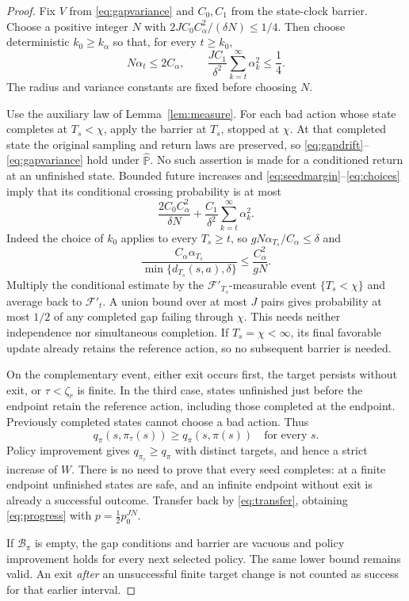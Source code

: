 \begin{proof}
Fix $V$ from \eqref{eq:gapvariance} and $C_0,C_1$ from the state-clock barrier. Choose a positive integer
$N$ with $2JC_0 C_\alpha^2/(\delta N)\le1/4$. Then choose deterministic $k_0\ge k_\alpha$ so that, for every $t\ge k_0$,
\begin{equation}\label{eq:choices}
N\alpha_t\le2C_\alpha,\qquad\frac{JC_1}{\delta^2}\sum_{k=t}^{\infty}\alpha_k^2\le\frac14.
\end{equation}
The radius and variance constants are fixed before choosing $N$.

Use the auxiliary law of Lemma~\ref{lem:measure}. For each bad action whose state completes at
$T_s<\chi$, apply the barrier at $T_s$, stopped at $\chi$. At that completed state the original sampling
and return laws are preserved, so \eqref{eq:gapdrift}--\eqref{eq:gapvariance} hold under $\widehat{\mathbb P}$. No such assertion is made for
a conditioned return at an unfinished state. Bounded future increases and \eqref{eq:seedmargin}--\eqref{eq:choices} imply that its
conditional crossing probability is at most
\begin{equation}\label{eq:crossprob}
\frac{2C_0 C_\alpha^2}{\delta N}+\frac{C_1}{\delta^2}\sum_{k=t}^{\infty}\alpha_k^2.
\end{equation}
Indeed the choice of $k_0$ applies to every $T_s\ge t$, so $gN\alpha_{T_s}/C_\alpha\le\delta$ and
\[
\frac{C_\alpha\alpha_{T_s}}{\min\{d_{T_s}(s,a),\delta\}}\le\frac{C_\alpha^2}{gN}.
\]
Multiply the conditional estimate by
the $\mathcal F'_{T_s}$-measurable event $\{T_s<\chi\}$ and average back to $\mathcal F'_t$. A union bound over at most
$J$ pairs gives probability at most $1/2$ of any completed gap failing through $\chi$. This needs
neither independence nor simultaneous completion. If $T_s=\chi<\infty$, its final favorable update
already retains the reference action, so no subsequent barrier is needed.

On the complementary event, either exit occurs first, the target persists without exit,
or $\tau<\zeta_r$ is finite. In the third case, states unfinished just before the endpoint retain the
reference action, including those completed at the endpoint. Previously completed states
cannot choose a bad action. Thus
\[
q_\pi(s,\pi_\tau(s))\ge q_\pi(s,\pi(s))\quad\text{for every }s.
\]
Policy improvement gives $q_{\pi_\tau}\ge q_\pi$ with distinct targets, and hence a strict increase of $W$.
There is no need to prove that every seed completes: at a finite endpoint unfinished states
are safe, and an infinite endpoint without exit is already a successful outcome. Transfer back
by \eqref{eq:transfer}, obtaining \eqref{eq:progress} with $p=\frac12p_0^{JN}$.

If $\mathcal B_\pi$ is empty, the gap conditions and barrier are vacuous and policy improvement
holds for every next selected policy. The same lower bound remains valid. An exit \emph{after} an
unsuccessful finite target change is not counted as success for that earlier interval.
\end{proof}

